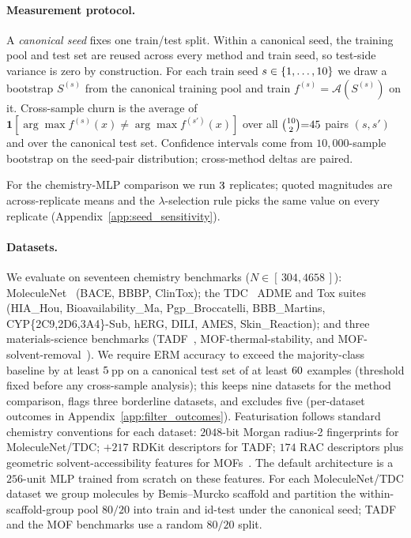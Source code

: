 \paragraph{Measurement protocol.}
A \emph{canonical seed} fixes one train/test split.  Within a
canonical seed, the training pool and test set are reused across
every method and train seed, so test-side variance is zero by
construction.  For each train seed $s \in \{1, \dots, 10\}$ we
draw a bootstrap $S^{(s)}$ from the canonical training pool and
train $f^{(s)} = \mathcal{A}(S^{(s)})$ on it.  Cross-sample churn is the average of
$\mathbf{1}[\arg\max f^{(s)}(x) \neq \arg\max f^{(s')}(x)]$ over all
$\binom{10}{2}{=}45$ pairs $(s, s')$ and over the canonical test set.
Confidence intervals come from $10{,}000$-sample bootstrap on the
seed-pair distribution; cross-method deltas are paired.

For the chemistry-MLP comparison we run $3$
replicates; quoted magnitudes are across-replicate means and the $\lambda$-selection
rule picks the same value on every replicate
(Appendix~\ref{app:seed_sensitivity}).

\paragraph{Datasets.}
\label{sec:datasets}
We evaluate on seventeen chemistry benchmarks
($N \in [\,304, 4658\,]$): MoleculeNet~\citep{Wu2018}
(BACE, BBBP, ClinTox); the TDC~\citep{huang2021therapeutics} ADME
and Tox suites (HIA\_Hou, Bioavailability\_Ma, Pgp\_Broccatelli,
BBB\_Martins, CYP\{2C9,2D6,3A4\}-Sub, hERG, DILI, AMES,
Skin\_Reaction); and three materials-science
benchmarks (TADF~\citep{jablonka2026clever, Huang2024},
MOF-thermal-stability, and MOF-solvent-removal~\citep{jablonka2026clever, Nandy2022}).
We require ERM accuracy to exceed the majority-class baseline by at
least $5$\,pp on a canonical test set of at least
$60$ examples (threshold fixed before any
cross-sample analysis); this keeps nine datasets for the method
comparison, flags three borderline datasets, and excludes five
(per-dataset outcomes in Appendix~\ref{app:filter_outcomes}).  
Featurisation follows standard chemistry conventions for each dataset: $2048$-bit Morgan radius-2
fingerprints for MoleculeNet/TDC; $+217$ RDKit descriptors for
TADF; $174$ RAC descriptors plus geometric solvent-accessibility
features for MOFs~\citep{Moosavi2020}.  The default architecture is
a $256$-unit MLP trained from scratch on these features.  For each
MoleculeNet/TDC dataset we group molecules by Bemis--Murcko scaffold
and partition the within-scaffold-group pool $80/20$ into train and
id-test under the canonical seed; TADF and the MOF benchmarks use a
random $80/20$ split.

